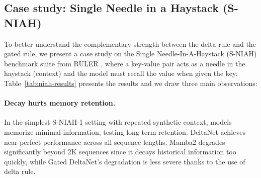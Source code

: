 \documentclass{article}
\begin{document}
 \begin{table}[t!]
 \vspace{-3mm}
 \caption{Zero-shot performance comparison on S-NIAH benchmark suite for 1.3B models (see \S\ref{sec:setup} for setups) 
}
\vspace{-2mm}
\centering
{}
\label{tab:niah-results}
\vspace{-4mm}
\end{table}
\vspace{-2mm}
\subsection{Case study: Single Needle in a Haystack (S-NIAH)} 
\label{sec:case_study}
\vspace{-1mm}
To better understand the complementary strength between the delta rule and the gated rule, we present a case study on the Single Needle-In-A-Haystack (S-NIAH) benchmark suite from RULER \citep{hsieh2024ruler}, where a key-value pair acts as a needle in the haystack (context) and the model must recall the value when given the key. 
 Table~\ref{tab:niah-results} presents the results and we draw three main observations:\vspace{-1mm}
\paragraph{{Decay hurts memory retention}.} In the simplest S-NIAH-1 setting with repeated synthetic context, models memorize minimal information, testing long-term retention.
DeltaNet achieves near-perfect performance across all sequence lengths. Mamba2 degrades significantly beyond 2K sequences since it decays historical information too quickly, while Gated DeltaNet's degradation is less severe thanks to the use of delta rule.
\vspace{-1mm}
\end{document}
